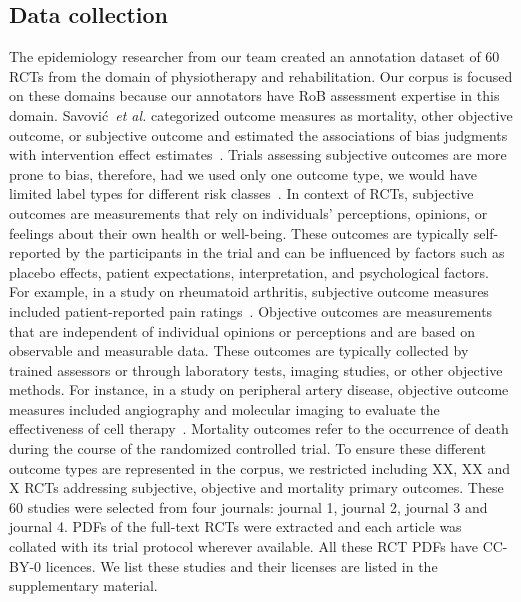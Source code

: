 \documentclass[sn-mathphys,Numbered]{sn-jnl}%
\theoremstyle{thmstyleone}%
\theoremstyle{thmstyletwo}%
\theoremstyle{thmstylethree}%
\begin{document}
\subsection{Data collection}
\label{data}
%
The epidemiology researcher from our team created an annotation dataset of 60 RCTs from the domain of physiotherapy and rehabilitation.
Our corpus is focused on these domains because our annotators have RoB assessment expertise in this domain.
Savović~\textit{et al.} categorized outcome measures as mortality, other objective outcome, or subjective outcome and estimated the associations of bias judgments with intervention effect estimates~\cite{savovic2018association}.
Trials assessing subjective outcomes are more prone to bias, therefore, had we used only one outcome type, we would have limited label types for different risk classes~\cite{page2016empirical}.
In context of RCTs, subjective outcomes are measurements that rely on individuals' perceptions, opinions, or feelings about their own health or well-being.
These outcomes are typically self-reported by the participants in the trial and can be influenced by factors such as  placebo effects, patient expectations, interpretation, and psychological factors.
For example, in a study on rheumatoid arthritis, subjective outcome measures included patient-reported pain ratings~\cite{vollert2020assessment}.
Objective outcomes are measurements that are independent of individual opinions or perceptions and are based on observable and measurable data.
These outcomes are typically collected by trained assessors or through laboratory tests, imaging studies, or other objective methods.
For instance, in a study on peripheral artery disease, objective outcome measures included angiography and molecular imaging to evaluate the effectiveness of cell therapy~\cite{grimaldi2016imaging}.
Mortality outcomes refer to the occurrence of death during the course of the randomized controlled trial.
To ensure these different outcome types are represented in the corpus, we restricted including XX, XX and X RCTs addressing subjective, objective and mortality primary outcomes.
These 60 studies were selected from four journals: journal 1, journal 2, journal 3 and journal 4. 
PDFs of the full-text RCTs were extracted and each article was collated with its trial protocol wherever available.
All these RCT PDFs have CC-BY-0 licences.
We list these studies and their licenses are listed in the supplementary material.
\end{document}
